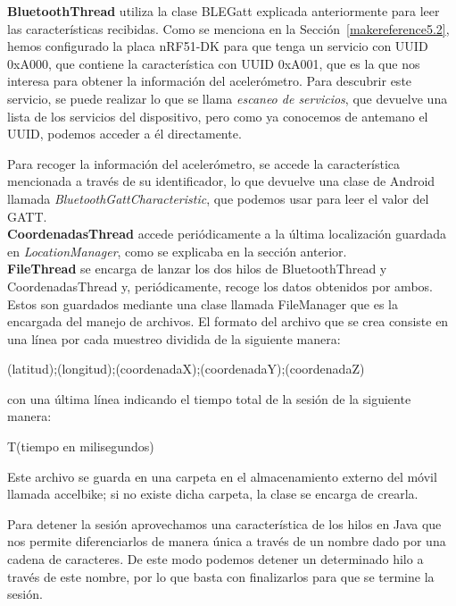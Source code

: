 \textbf{BluetoothThread} utiliza la clase BLEGatt explicada anteriormente para leer las características recibidas. Como se menciona en la Sección~\ref{makereference5.2}, hemos configurado la placa nRF51-DK para que tenga un servicio con UUID 0xA000, que contiene la característica con UUID 0xA001, que es la que nos interesa para obtener la información del acelerómetro. Para descubrir este servicio, se puede realizar lo que se llama \textit{escaneo de servicios}, que devuelve una lista de los servicios del dispositivo, pero como ya conocemos de antemano el UUID, podemos acceder a él directamente.

Para recoger la información del acelerómetro, se accede la característica mencionada a través de su identificador, lo que devuelve una clase de Android llamada \textit{BluetoothGattCharacteristic}, que podemos usar para leer el valor del GATT.\\

\textbf{CoordenadasThread} accede periódicamente a la última localización guardada en \textit{LocationManager}, como se explicaba en la sección anterior.\\

\textbf{FileThread} se encarga de lanzar los dos hilos de BluetoothThread y CoordenadasThread y, periódicamente, recoge los datos obtenidos por ambos. Estos son guardados mediante una clase llamada FileManager que es la encargada del manejo de archivos. El formato del archivo que se crea consiste en una línea por cada muestreo dividida de la siguiente manera:

\begin{center}
(latitud);(longitud);(coordenadaX);(coordenadaY);(coordenadaZ)
\end{center}

con una última línea indicando el tiempo total de la sesión de la siguiente manera: 

\begin{center}
T(tiempo en milisegundos)
\end{center}

Este archivo se guarda en una carpeta en el almacenamiento externo del móvil llamada accelbike; si no existe dicha carpeta, la clase se encarga de crearla.

Para detener la sesión aprovechamos una característica de los hilos en Java que nos permite diferenciarlos de manera única a través de un nombre dado por una cadena de caracteres. De este modo podemos detener un determinado hilo a través de este nombre, por lo que basta con finalizarlos para que se termine la sesión.

